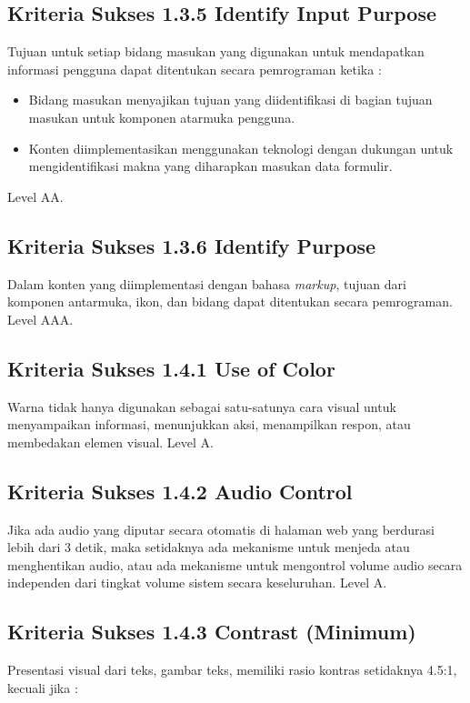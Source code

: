 \subsection{Kriteria Sukses 1.3.5 Identify Input Purpose}
\label{sec:kriteria_1.3.5}
Tujuan untuk setiap bidang masukan yang digunakan untuk mendapatkan informasi pengguna dapat ditentukan secara pemrograman ketika :

\begin{itemize}
	\item Bidang masukan menyajikan tujuan yang diidentifikasi di bagian tujuan masukan untuk komponen atarmuka pengguna.
	\item Konten diimplementasikan menggunakan teknologi dengan dukungan untuk mengidentifikasi makna yang diharapkan masukan data formulir.
\end{itemize}

Level AA.

\subsection{Kriteria Sukses 1.3.6 Identify Purpose}
\label{sec:kriteria_1.3.6}
Dalam konten yang diimplementasi dengan bahasa \textit{markup}, tujuan dari komponen antarmuka, ikon, dan bidang dapat ditentukan secara pemrograman.
Level AAA.

\subsection{Kriteria Sukses 1.4.1 Use of Color}
\label{sec:kriteria_1.4.1}
Warna tidak hanya digunakan sebagai satu-satunya cara visual untuk menyampaikan informasi, menunjukkan aksi, menampilkan respon, atau membedakan elemen visual.
Level A.

\subsection{Kriteria Sukses 1.4.2 Audio Control}
\label{sec:kriteria_1.4.2}
Jika ada audio yang diputar secara otomatis di halaman web yang berdurasi lebih dari 3 detik, maka setidaknya ada mekanisme untuk menjeda atau menghentikan audio, atau ada mekanisme untuk mengontrol volume audio secara independen dari tingkat volume sistem secara keseluruhan.
Level A.

\subsection{Kriteria Sukses 1.4.3 Contrast (Minimum)}
\label{sec:kriteria_1.4.3}
Presentasi visual dari teks, gambar teks, memiliki rasio kontras setidaknya 4.5:1, kecuali jika :

